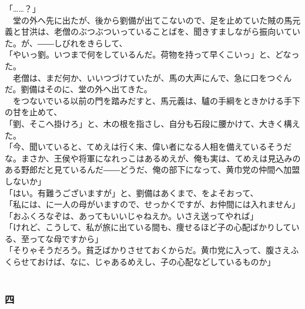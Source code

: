 \documentclass[
  paper=a5,
  fontsize=10pt,
  jafontsize=9.5pt,
  tate,                  %
  open_bracket_pos=nibu, %
]{jlreq}
\begin{document}
「……？」\\


　堂の外へ先に出たが、後から劉備が出てこないので、足を止めていた賊の馬元義と甘洪は、老僧のぶつぶついっていることばを、聞きすましながら振向いていた。が、――しびれをきらして、\\


「やいっ劉。いつまで何をしているんだ。荷物を持って早くこいっ」と、どなった。\\


　老僧は、まだ何か、いいつづけていたが、馬の大声にんで、急に口をつぐんだ。劉備はそのに、堂の外へ出てきた。\\


　をつないでいる以前の門を踏みだすと、馬元義は、驢の手綱をときかける手下の甘を止めて、\\


「劉、そこへ掛けろ」と、木の根を指さし、自分も石段に腰かけて、大きく構えた。\\


「今、聞いていると、てめえは行く末、偉い者になる人相を備えているそうだな。まさか、王侯や将軍になれっこはあるめえが、俺も実は、てめえは見込みのある野郎だと見ているんだ――どうだ、俺の部下になって、黄巾党の仲間へ加盟しないか」\\


「はい。有難うございますが」と、劉備はあくまで、をよそおって、\\


「私には、に一人の母がいますので、せっかくですが、お仲間には入れません」\\


「おふくろなぞは、あってもいいじゃねえか。いさえ送ってやれば」\\


「けれど、こうして、私が旅に出ている間も、痩せるほど子の心配ばかりしている、至ってな母ですから」\\


「そりゃそうだろう。貧乏ばかりさせておくからだ。黄巾党に入って、腹さえふくらせておけば、なに、じゃあるめえし、子の心配などしているものか」\\

\\

\subsubsection{四}
\end{document}
